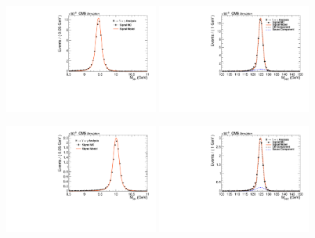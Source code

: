 \begin{figure}[!htbp]
\begin{center}


\includegraphics[width=0.45\textwidth]{figures_and_tables/fitPlotFiles2D/HToUpsilonPhotonSignalAndBackgroundFit/mMuMNU_HToUpsilon1SPhotonSignalAndBackgroundFit_Signal_Cat0}\hspace*{1.cm}
\includegraphics[width=0.45\textwidth]{figures_and_tables/fitPlotFiles2D/HToUpsilonPhotonSignalAndBackgroundFit/mHZ_HToUpsilon1SPhotonSignalAndBackgroundFit_Signal_Cat0_default}\hspace*{1.cm}

\includegraphics[width=0.45\textwidth]{figures_and_tables/fitPlotFiles2D/HToUpsilonPhotonSignalAndBackgroundFit/mMuMNU_HToUpsilon2SPhotonSignalAndBackgroundFit_Signal_Cat0}\hspace*{1.cm}
\includegraphics[width=0.45\textwidth]{figures_and_tables/fitPlotFiles2D/HToUpsilonPhotonSignalAndBackgroundFit/mHZ_HToUpsilon2SPhotonSignalAndBackgroundFit_Signal_Cat0_default}\hspace*{1.cm}


\end{center}
\end{figure}

